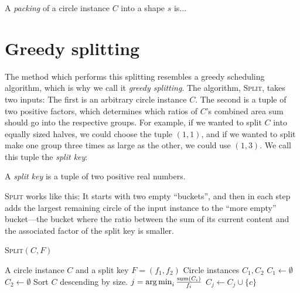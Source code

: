 \documentclass[a4paper,style=print,bibliography=totoc,nexus,lnum,extramargin]{tubsbook}
\begin{document}
\begin{definition}
    A \emph{packing} of a circle instance $C$ into a shape $s$ is...
\end{definition}

\section{Greedy splitting}

The method which performs this splitting resembles a greedy scheduling algorithm, which is why we call it \emph{greedy splitting}. The algorithm, \textsc{Split}, takes two inputs: The first is an arbitrary circle instance $C$. The second is a tuple of two positive factors, which determines which ratios of $C$'s combined area sum should go into the respective groups. For example, if we wanted to split $C$ into equally sized halves, we could choose the tuple $(1,1)$, and if we wanted to split make one group three times as large as the other, we could use $(1,3)$. We call this tuple the \emph{split key}:

\begin{definition}
    A \emph{split key} is a tuple of two positive real numbers.
\end{definition}

\textsc{Split} works like this: It starts with two empty “buckets”, and then in each step adds the largest remaining circle of the input instance to the “more empty” bucket---the bucket where the ratio between the sum of its current content and the associated factor of the split key is smaller.

\begin{algorithm}[H]
    \caption{\textsc{Split}$(C,F)$}
    \begin{algorithmic}
        \Require A circle instance $C$ and a split key $F = (f_1, f_2)$
        \Ensure Circle instances $C_1, C_2$
        \State $C_1 \gets \emptyset$
        \State $C_2 \gets \emptyset$
        \State Sort $C$ descending by size.
            \State $j = \operatorname*{arg\,min}_{i} \frac{\operatorname{sum}(C_i)}{f_i}$
            \State $C_j \gets C_j \cup \{c\}$
        \EndFor
    \end{algorithmic}
\end{algorithm}
\end{document}
